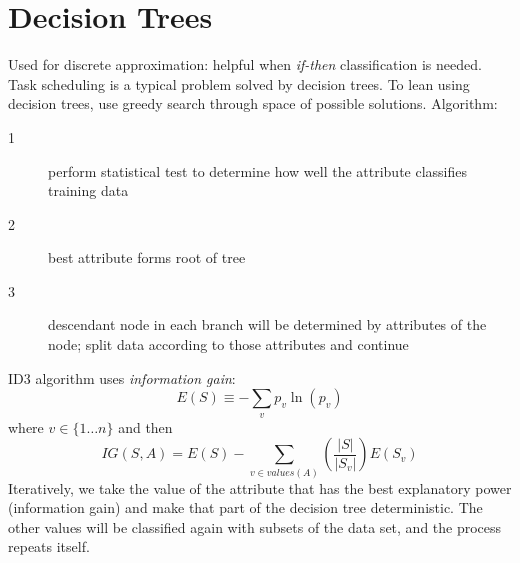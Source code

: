 \documentclass{amsart}
\theoremstyle{definition}
\theoremstyle{remark}
\numberwithin{equation}{section}
\begin{document}
\section{Decision Trees}
Used for discrete approximation: helpful when \emph{if-then} classification is needed.  Task scheduling is a typical problem solved by decision trees.  To lean using decision trees, use greedy search through space of possible solutions.  Algorithm:
\begin{description}
\item[1] perform statistical test to determine how well the attribute classifies training data
\item[2] best attribute forms root of tree
\item[3] descendant node in each branch will be determined by attributes of the node; split data according to those attributes and continue
\end{description}
ID3 algorithm uses \emph{information gain}:
$$
E(S) \equiv -\sum_v p_v\ln(p_v)
$$
where $v\in \{1\ldots n\}$ and then
$$
IG(S, A) = E(S) - \sum_{v\in values(A)}\left(\frac{|S|}{|S_v|}\right) E(S_v)
$$
Iteratively, we take the value of the attribute that has the best explanatory power (information gain) and make that part of the decision tree deterministic.  The other values will be classified again with subsets of the data set, and the process repeats itself. 
\end{document}
